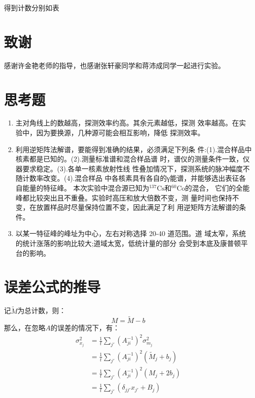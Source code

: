 \documentclass{article}
\begin{document}
    得到计数分别如表
\section{致谢}
    感谢许金艳老师的指导，也感谢张轩豪同学和蒋沛成同学一起进行实验。 
    \clearpage
    \appendix
    \appendixpage
    \section{思考题}
    \begin{enumerate}
        \item 主对角线上的数越高，探测效率约高。其余元素越低，探测
        效率越高。在实验中，因为要换源，几种源可能会相互影响，降低 探测效率。
        \item 利用逆矩阵法解谱，要能得到准确的结果，必须满足下列条
        件:(1).混合样品中核素都是已知的。(2).测量标准谱和混合样品谱 时，谱仪的测量条件一致，仪器要求稳定。(3).各单一核素放射性线 性叠加情况下，探测系统的脉冲幅度不随计数率改变。(4).混合样品 中各核素具有各自的γ能谱，并能够选出表征各自能量的特征峰。
        本次实验中混合源已知为$^{137}\text{Cs}$和$^{60}\text{Co}$的混合， 它们的全能峰都比较突出且不重叠。实验时高压和放大倍数不变，测 量时间也保持不变，在放置样品时尽量保持位置不变，因此满足了利 用逆矩阵方法解谱的条件。
        \item 以某一特征峰的峰址为中心，左右对称选择 20-40 道范围。道 域太窄，系统的统计涨落的影响比较大;道域太宽，低统计量的部分 会受到本底及康普顿平台的影响。
    \end{enumerate}
    \section{误差公式的推导}
    记$\tilde{M}$为总计数，则：
    \begin{equation}
        M = \tilde{M} - b
    \end{equation}
    那么，在忽略$A$的误差的情况下，有：
    \begin{equation}
        \begin{aligned}
            \sigma_{x_j}^2 &= \frac{1}{t}\sum_{j'}(A^{-1}_{ji})^2\sigma_{m_j}^2\\
            &=  \frac{1}{t}\sum_{j'} (A_{ji}^{-1})^2({\tilde{M}_j}+b_j)\\
            &=  \frac{1}{t}\sum_{j'} (A_{ji}^{-1})^2({{M}_j}+2b_j) \\
            &=\frac{1}{t}\sum_{j'}(\delta_{jj'}x_{j'} + B_j)
        \end{aligned}
    \end{equation}
\end{document}
